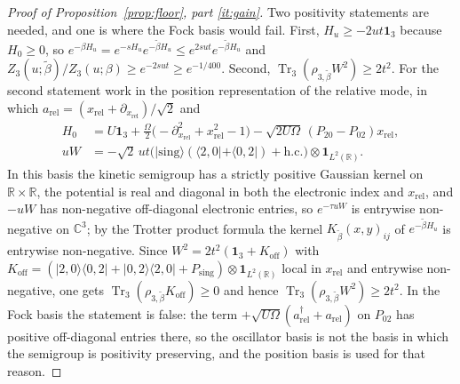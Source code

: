\documentclass[11pt]{article}
\theoremstyle{plain}
\theoremstyle{definition}
\DeclareMathOperator{\Tr}{Tr}
\begin{document}
\begin{proof}[Proof of Proposition~\ref{prop:floor}, part \ref{it:gain}]
Two positivity statements are needed, and one is where the Fock basis would fail.
First, $H_u\ge-2ut\mathbf 1_3$ because $H_0\ge0$, so
$e^{-\beta H_u}=e^{-sH_u}e^{-\tilde\beta H_u}\le e^{2sut}e^{-\tilde\beta H_u}$ and
$Z_3(u;\tilde\beta)/Z_3(u;\beta)\ge e^{-2sut}\ge e^{-1/400}$. Second,
$\Tr_3(\rho_{3,\tilde\beta}W^{2})\ge2t^{2}$. For the second statement work in the
position representation of the relative mode, in which
$a_{\mathrm{rel}}=(x_{\mathrm{rel}}+\partial_{x_{\mathrm{rel}}})/\sqrt2$ and
\begin{equation}\label{eq:posbasis}
\begin{aligned}
H_0&=U\mathbf 1_3+\frac\Omega2\bigl(-\partial_{x_{\mathrm{rel}}}^{2}+x_{\mathrm{rel}}^{2}-1\bigr)
-\sqrt{2U\Omega}\,(P_{20}-P_{02})x_{\mathrm{rel}},\\
uW&=-\sqrt2\,ut\bigl(|\mathrm{sing}\rangle(\langle2,0|+\langle0,2|)+\mathrm{h.c.}\bigr)\otimes\mathbf 1_{L^{2}(\mathbb R)} .
\end{aligned}
\end{equation}
In this basis the kinetic semigroup has a strictly positive Gaussian kernel on
$\mathbb R\times\mathbb R$, the potential is real and diagonal in both the
electronic index and $x_{\mathrm{rel}}$, and $-uW$ has non-negative off-diagonal
electronic entries, so $e^{-\tau uW}$ is entrywise non-negative on $\mathbb C^3$;
by the Trotter product formula the kernel $K_{\tilde\beta}(x,y)_{ij}$ of
$e^{-\tilde\beta H_u}$ is entrywise non-negative. Since
$W^{2}=2t^{2}(\mathbf 1_3+K_{\mathrm{off}})$ with
$K_{\mathrm{off}}=(|2,0\rangle\langle0,2|+|0,2\rangle\langle2,0|+P_{\mathrm{sing}})\otimes\mathbf 1_{L^{2}(\mathbb R)}$
local in $x_{\mathrm{rel}}$ and entrywise non-negative, one gets
$\Tr_3(\rho_{3,\tilde\beta}K_{\mathrm{off}})\ge0$ and hence
$\Tr_3(\rho_{3,\tilde\beta}W^{2})\ge2t^{2}$. In the Fock basis the statement is
false: the term $+\sqrt{U\Omega}(a^\dagger_{\mathrm{rel}}+a_{\mathrm{rel}})$ on
$P_{02}$ has positive off-diagonal entries there, so the oscillator basis is not
the basis in which the semigroup is positivity preserving, and the position basis
is used for that reason.


\end{proof}
\end{document}
